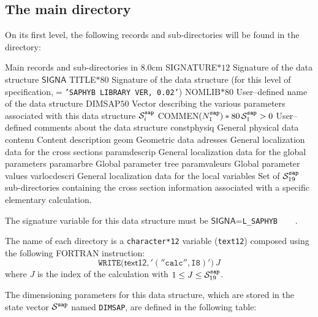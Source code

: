 \subsection{The main  directory}\label{sect:sapdirmain}

On its first level, the
following records and sub-directories will be found in the  directory:

\begin{DescriptionEnregistrement}{Main records and sub-directories in }{8.0cm}
\CharEnr
  {SIGNATURE}{$*12$}
  {Signature of the data structure $\mathsf{SIGNA}$}
\CharEnr
  {TITLE}{$*80$}
  {Signature of the data structure (for this level of specification,$=${\tt'SAPHYB LIBRARY VER, 0.02'})}
\CharEnr
  {NOMLIB}{$*80$}
  {User--defined name of the data structure}
\IntEnr
  {DIMSAP}{$50$}
  {Vector describing the various parameters associated with this data structure $\mathcal{S}^{\tt sap}_{i}$}
\OptCharEnr
  {COMMEN}{$(N^{\tt sap}_1)*80$}{$\mathcal{S}^{\tt sap}_1> 0$}
  {User--defined comments about the data structure}
\DirEnr
  {constphysiq}
  {General physical data}
\DirEnr
  {contenu}
  {Content description}
\DirEnr
  {geom}
  {Geometric data}
\DirEnr
  {adresses}
  {General localization data for the cross sections}
\DirEnr
  {paramdescrip}
  {General localization data for the global parameters}
\DirEnr
  {paramarbre}
  {Global parameter tree}
\DirEnr
  {paramvaleurs}
  {Global parameter values}
\DirEnr
  {varlocdescri}
  {General localization data for the local variables}
\DirVar
  {}
  {Set of $\mathcal{S}^{\tt sap}_{19}$ sub-directories containing the cross section information
   associated with a specific elementary calculation.}
\end{DescriptionEnregistrement}

The signature variable for this data structure must be $\mathsf{SIGNA}$=\verb*|L_SAPHYB    |.

\vskip 0.1cm

The name of each  directory is a {\tt character*12} variable ({\tt text12})
composed using the following FORTRAN instruction:
$$
\mathtt{WRITE(}\mathsf{text12}\mathtt{,'(''calc'',I8)')}\: J
$$
where $J$ is the index of the calculation with $1 \leq J \leq \mathcal{S}^{\tt sap}_{19}$.

\vskip 0.1cm

The dimensioning parameters for this data structure, which are stored in the state vector
$\mathcal{S}^{\tt sap}$ named {\tt DIMSAP}, are defined in the following table:

